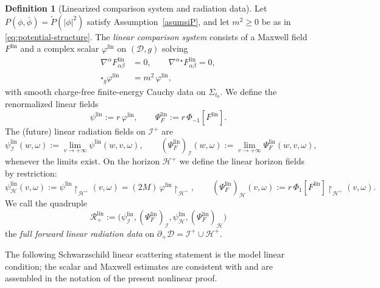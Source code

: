 \documentclass[11pt]{article}
\numberwithin{equation}{section}
\theoremstyle{plain}
\theoremstyle{definition}
\newtheorem{definition}{Definition}[section]
\theoremstyle{remark}
\newcommand{\D}{\mathcal{D}}
\begin{document}
\begin{definition}[Linearized comparison system and radiation data]\label{def:linear-system}
Let $P(\phi,\bar\phi)=\widetilde P(|\phi|^2)$ satisfy Assumption~\ref{asumsiP}, and let $m^{2}\ge 0$ be as in \eqref{eq:potential-structure}.
The \emph{linear comparison system} consists of a Maxwell field $F^{\mathrm{lin}}$ and a complex scalar $\varphi^{\mathrm{lin}}$ on $(\D,g)$ solving
\begin{eqnarray}
\nabla^\alpha F^{\mathrm{lin}}_{\alpha\beta}&=0,
\qquad
\nabla^\alpha {}^\star F^{\mathrm{lin}}_{\alpha\beta}=0,
\label{eq:lin-maxwell}
\\
\square_g \varphi^{\mathrm{lin}}&=m^2\,\varphi^{\mathrm{lin}},
\label{eq:lin-kg}
\end{eqnarray}
with smooth charge-free finite-energy Cauchy data on $\Sigma_{t_0}$.
We define the renormalized linear fields
\begin{equation}
\psi^{\mathrm{lin}}:=r\,\varphi^{\mathrm{lin}},
\qquad
\Psi_{F}^{\mathrm{lin}}:=r\,\Phi_{-1}[F^{\mathrm{lin}}].
\end{equation}
The (future) linear radiation fields on $\mathcal I^{+}$ are
\begin{equation}
\psi_{\mathcal I}^{\mathrm{lin}}(w,\omega):=\lim_{v\to+\infty}\psi^{\mathrm{lin}}(w,v,\omega),
\qquad
(\Psi_F^{\mathrm{lin}})_{\mathcal I}(w,\omega):=\lim_{v\to+\infty}\Psi_F^{\mathrm{lin}}(w,v,\omega),
\end{equation}
whenever the limits exist.
On the horizon $\mathcal H^{+}$ we define the linear horizon fields by restriction:
\begin{equation}
\psi_{\mathcal H}^{\mathrm{lin}}(v,\omega):=\psi^{\mathrm{lin}}\!\restriction_{\mathcal H^{+}}(v,\omega)=(2M)\,\varphi^{\mathrm{lin}}\!\restriction_{\mathcal H^{+}},
\qquad
(\Psi_F^{\mathrm{lin}})_{\mathcal H}(v,\omega):=r\,\Phi_{1}[F^{\mathrm{lin}}]\!\restriction_{\mathcal H^{+}}(v,\omega).
\end{equation}
We call the quadruple
\begin{equation}
\mathcal R_{+}^{\mathrm{lin}}
:=
\bigl(\psi_{\mathcal I}^{\mathrm{lin}},(\Psi_F^{\mathrm{lin}})_{\mathcal I},\psi_{\mathcal H}^{\mathrm{lin}},(\Psi_F^{\mathrm{lin}})_{\mathcal H}\bigr)
\end{equation}
the \emph{full forward linear radiation data} on $\partial_{+}\D=\mathcal I^{+}\cup\mathcal H^{+}$.
\end{definition}

The following Schwarzschild linear scattering statement is the model linear condition; the scalar and Maxwell estimates are consistent with \cite{dafermos,Blue,Ander1,Dimock,BachelotKG} and are assembled in the notation of the present nonlinear proof.
\end{document}
